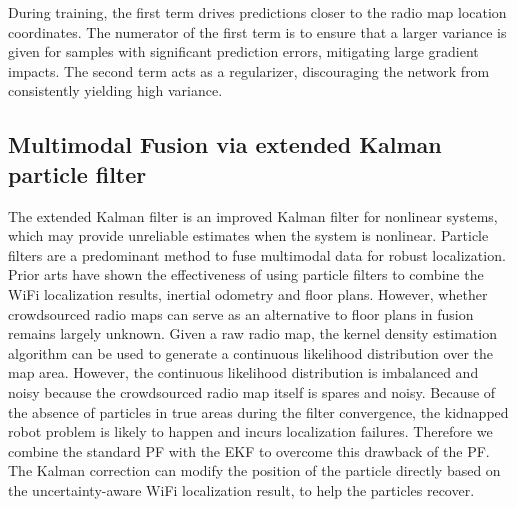 During training, the first term drives predictions closer to the radio map location coordinates. The numerator of the first term is to ensure that a larger variance is given for samples with significant prediction errors, mitigating large gradient impacts. The second term acts as a regularizer, discouraging the network from consistently yielding high variance.


\subsection{Multimodal Fusion via extended Kalman particle filter}
The extended Kalman filter is an improved Kalman filter for nonlinear systems, which
may provide unreliable estimates when the system is nonlinear. 
Particle filters are a predominant method to fuse multimodal data for robust localization. Prior arts have shown the effectiveness of using particle filters to combine the WiFi localization results, inertial odometry and floor plans. However, whether crowdsourced radio maps can serve as an alternative to floor plans in fusion remains largely unknown. Given a raw radio map, the kernel density estimation algorithm\cite{} can be used to generate a continuous likelihood distribution over the map area. However, the continuous likelihood distribution is imbalanced and noisy because the crowdsourced radio map itself is spares and noisy. Because of the absence of particles in true areas during the filter convergence\cite{Bukhori2017Detection}, the kidnapped robot problem \cite{Thrun2005Probabilistic,hester2008negative} is likely to happen and incurs localization failures. Therefore we combine the standard PF with the EKF to overcome this drawback of the PF. The Kalman correction can modify the position of the particle directly based on the uncertainty-aware WiFi localization result, to help the particles recover. 

